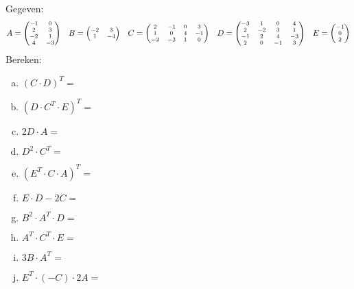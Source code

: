 \documentclass[12pt,twoside]{article}
\begin{document}
\begin{oefening}\\
Gegeven:
$$
\scriptsize
A=\begin{pmatrix}
  -1 & 0\\
  2 & 3\\
  -2 & 1\\
  4 & -3
\end{pmatrix}
\quad
B=\begin{pmatrix}
  -2 & 3\\
  1 & -4\\
\end{pmatrix}
\quad
C=\begin{pmatrix}
  2 & -1 & 0 & 3\\
  1 & 0 & 4 & -1\\
  -2 & -3 & 1 & 0\\
\end{pmatrix}
\quad
D=\begin{pmatrix}
  -3 & 1 & 0 & 4\\
  2 & -2 & 3 & 1\\
  -1 & 2 & 4 & -3\\
  2 & 0 & -1 & 3\\
\end{pmatrix}
\quad
E=\begin{pmatrix}
  -1\\
  0\\
  2\\
\end{pmatrix}
$$
Bereken:
\begin{multicols}{2}
  \begin{enumerate}[(a)]
    \itemsep1em
    \item $(C\cdot D)^T=$
    \item $(D\cdot C^T\cdot E)^T=$
    \item $2D\cdot A=$
    \item $D^2\cdot C^T=$
    \item $(E^T\cdot C\cdot A)^T=$
    \item $E\cdot D - 2C=$
    \item $B^2\cdot A^T\cdot D=$
    \item $A^T\cdot C^T\cdot E=$
    \item $3B\cdot A^T=$
    \item $E^T\cdot(-C)\cdot 2A=$
  \end{enumerate}
\end{multicols}
\end{oefening}
\end{document}
